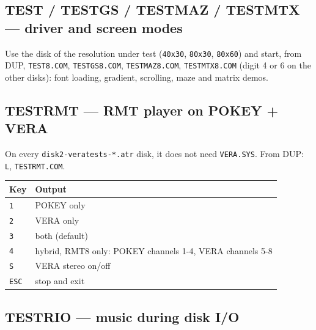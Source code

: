 \documentclass[
]{article}
\newenvironment{Shaded}{}{}
\newcommand{\AttributeTok}[1]{\textcolor[rgb]{0.49,0.56,0.16}{#1}}
\newcommand{\DataTypeTok}[1]{\textcolor[rgb]{0.56,0.13,0.00}{#1}}
\newcommand{\NormalTok}[1]{#1}
\newcommand{\VariableTok}[1]{\textcolor[rgb]{0.10,0.09,0.49}{#1}}
\begin{document}
\subsection{TEST / TESTGS / TESTMAZ / TESTMTX --- driver and screen
modes}\label{test-testgs-testmaz-testmtx-driver-and-screen-modes}

\begin{Shaded}
\end{Shaded}

Use the disk of the resolution under test (\texttt{40x30},
\texttt{80x30}, \texttt{80x60}) and start, from DUP, \texttt{TEST8.COM},
\texttt{TESTGS8.COM}, \texttt{TESTMAZ8.COM}, \texttt{TESTMTX8.COM}
(digit 4 or 6 on the other disks): font loading, gradient, scrolling,
maze and matrix demos.

\subsection{TESTRMT --- RMT player on POKEY +
VERA}\label{testrmt-rmt-player-on-pokey-vera}

On every \texttt{disk2-veratests-*.atr} disk, it does not need
\texttt{VERA.SYS}. From DUP: \texttt{L}, \texttt{TESTRMT.COM}.

\begin{longtable}[]{@{}ll@{}}
\toprule\noalign{}
Key & Output \\
\midrule\noalign{}
\endhead
\bottomrule\noalign{}
\endlastfoot
\texttt{1} & POKEY only \\
\texttt{2} & VERA only \\
\texttt{3} & both (default) \\
\texttt{4} & hybrid, RMT8 only: POKEY channels 1-4, VERA channels 5-8 \\
\texttt{S} & VERA stereo on/off \\
\texttt{ESC} & stop and exit \\
\end{longtable}

\subsection{TESTRIO --- music during disk
I/O}\label{testrio-music-during-disk-io}
\end{document}
